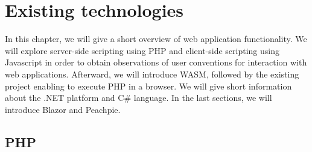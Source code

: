 \chapter{Existing technologies}

In this chapter, we will give a short overview of web application functionality. 
We will explore server-side scripting using PHP and client-side scripting using Javascript in order to obtain observations of user conventions for interaction with web applications.
Afterward, we will introduce WASM, followed by the existing project enabling to execute PHP in a browser.
We will give short information about the .NET platform and C\# language.
In the last sections, we will introduce Blazor and Peachpie.

\section{PHP}

